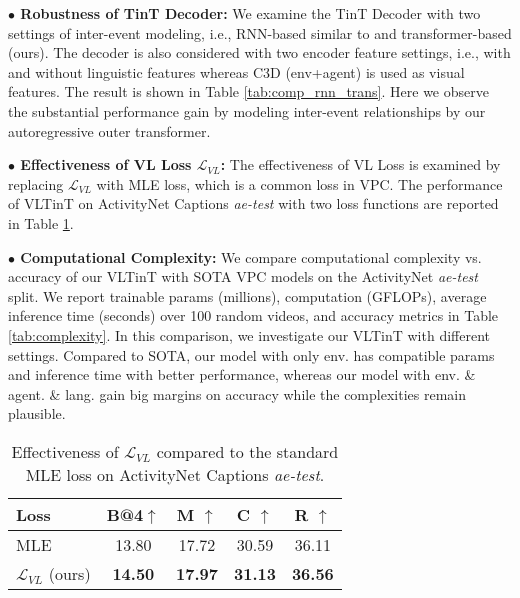 \documentclass[letterpaper]{article} \usepackage{aaai23}  \usepackage{times}  \usepackage{helvet}  \usepackage{courier}  \usepackage[hyphens]{url}  \usepackage{graphicx} \urlstyle{rm} \def\UrlFont{\rm}  \usepackage{natbib}  \usepackage{caption} \frenchspacing  \setlength{\pdfpagewidth}{8.5in}  \setlength{\pdfpageheight}{11in}  \usepackage{algorithm}
\begin{document}
\vspace{2mm}
\noindent
\textbf{$\bullet$ Robustness of TinT Decoder: } We examine the TinT Decoder with two settings of inter-event modeling, i.e., RNN-based similar to \cite{lei2020mart} and  transformer-based (ours). 
The decoder is also considered with two encoder feature settings, i.e., with and without linguistic features whereas C3D (env+agent) is used as visual features. The result is shown in Table \ref{tab:comp_rnn_trans}. Here we observe the substantial performance gain by modeling inter-event relationships by our autoregressive outer transformer. 

\vspace{2mm}
\noindent
\textbf{$\bullet$ Effectiveness of VL Loss $\mathcal{L}_{VL}$: } The effectiveness of VL Loss is examined by replacing $\mathcal{L}_{VL}$ with MLE loss, which is a common loss in VPC. The performance of VLTinT on ActivityNet Captions \emph{ae-test} with two loss functions are reported in Table \ref{tab:l_clip}.

\vspace{2mm}
\noindent
\textbf{$\bullet$ Computational Complexity: } We compare computational complexity vs. accuracy of our VLTinT with SOTA VPC models on the ActivityNet \emph{ae-test} split. We report trainable params (millions), computation (GFLOPs), average inference time (seconds) over 100 random videos, and accuracy metrics in Table \ref{tab:complexity}. In this comparison, we investigate our VLTinT with different settings. Compared to SOTA, our model with only env. has compatible params and inference time with better performance, whereas our model with env. \& agent. \& lang. gain big margins on accuracy while the complexities remain plausible.









\begin{table}[t]
\centering
\caption{Effectiveness of $\mathcal{L}_{VL}$ compared to the standard MLE loss on ActivityNet Captions \emph{ae-test}. }\begin{tabular}{l|cccc}
\toprule
Loss &  B@4$\uparrow$ & M $\uparrow$&  C $\uparrow$ & R $\uparrow$ \\\hline
MLE & 13.80 & 17.72 & 30.59 & 36.11  \\ $\mathcal{L}_{VL}$ (ours) & \textbf{14.50} & \textbf{17.97} & \textbf{31.13} & \textbf{36.56} \\ \bottomrule
\end{tabular}
\label{tab:l_clip}
\end{table}
\end{document}
